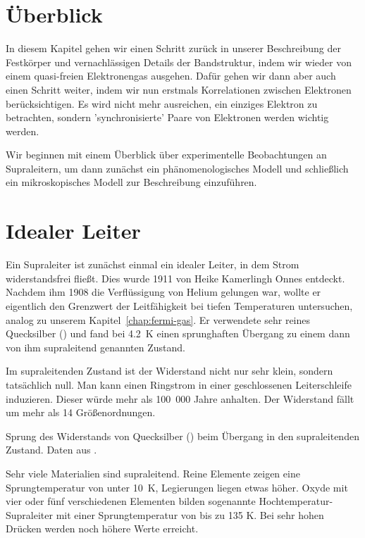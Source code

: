 \section{Überblick}

In diesem Kapitel gehen wir einen Schritt zurück in unserer Beschreibung der Festkörper und vernachlässigen Details der Bandstruktur, indem wir wieder von einem quasi-freien Elektronengas ausgehen. Dafür gehen wir dann aber auch einen Schritt weiter, indem wir nun erstmals Korrelationen zwischen Elektronen berücksichtigen. Es wird nicht mehr ausreichen, ein einziges Elektron zu betrachten, sondern 'synchronisierte' Paare von Elektronen werden wichtig werden.

Wir beginnen mit einem Überblick über experimentelle Beobachtungen an Supraleitern, um dann zunächst ein phänomenologisches  Modell und schließlich ein mikroskopisches Modell zur Beschreibung einzuführen.

\section*{Idealer Leiter}

Ein Supraleiter ist zunächst einmal ein idealer Leiter, in dem Strom widerstandsfrei fließt. Dies wurde 1911 von Heike Kamerlingh Onnes entdeckt. Nachdem ihm 1908 die Verflüssigung von Helium gelungen war, wollte er eigentlich den Grenzwert der Leitfähigkeit bei tiefen Temperaturen untersuchen, analog zu unserem Kapitel~\ref{chap:fermi-gas}. Er verwendete sehr reines Quecksilber () und fand bei 4.2~K einen sprunghaften Übergang zu einem dann von ihm supraleitend genannten Zustand.

Im supraleitenden Zustand ist der Widerstand nicht nur sehr klein, sondern tatsächlich null. Man kann einen Ringstrom in einer geschlossenen Leiterschleife induzieren. Dieser würde mehr als 100~000 Jahre anhalten. Der Widerstand fällt um mehr als 14 Größenordnungen.

\begin{marginfigure}
    \caption{Sprung des Widerstands von Quecksilber () beim Übergang in den supraleitenden Zustand. Daten aus \cite{Kamerlingh_Onnes_1911}.}
\end{marginfigure}

Sehr viele Materialien sind supraleitend. Reine Elemente zeigen eine Sprungtemperatur  von unter 10~K, Legierungen liegen etwas höher. Oxyde mit vier oder fünf verschiedenen Elementen bilden sogenannte Hochtemperatur-Supraleiter mit einer Sprungtemperatur von bis zu 135 K. Bei sehr hohen Drücken werden noch höhere Werte erreicht.

